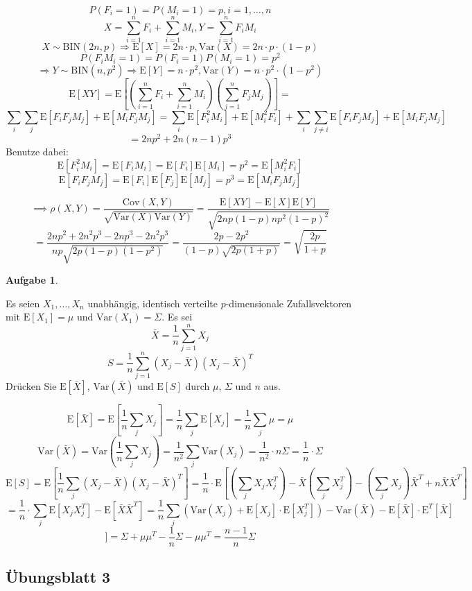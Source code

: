 \documentclass[12pt, a4paper]{article}
\newcommand{\E}{\mbox{I\negthinspace E}}
\theoremstyle{plain}
\theoremstyle{definition}
\newtheorem{aufgabe}{Aufgabe}
\newcommand{\1}{\mathds{1}}
\renewcommand{\E}{\mathrm{E}}
\newcommand{\Var}{\mathrm{Var}}
\newcommand{\BIN}{\mathrm{BIN}}
\newcommand{\Cov}{\mathrm{Cov}}
\begin{document}
\[ P(F_i=1) = P(M_i=1) = p, i=1,\dots,n \]
\[ X = \sum_{i=1}^n F_i + \sum_{i=1}^n M_i, Y = \sum_{i=1}^n F_iM_i \]
\[ X \sim \BIN(2n,p) \Rightarrow \E[X] = 2n \cdot p, \Var(X) = 2n \cdot p \cdot (1-p) \]
\[ P(F_iM_i = 1) = P(F_i=1) P(M_i=1) = p^2 \]
\[ \Rightarrow Y \sim \BIN(n,p^2) \Rightarrow \E[Y] = n \cdot p^2, \Var(Y) = n \cdot p^2 \cdot (1-p^2) \]
\[ \E[XY] = \E \left[ \left( \sum_{i=1}^n F_i + \sum_{i=1}^n M_i \right) \left( \sum_{j=1}^n F_jM_j \right) \right] =\]
\[ \sum_i \sum_j \E[F_iF_jM_j] + \E[M_iF_jM_j] = \sum_i \E[F_i^2M_i] + \E[M_i^2F_i] + \sum_i \sum_{j\neq i} \E[F_iF_jM_j] + \E[M_iF_jM_j] \]
\[= 2np^2 + 2n(n-1)p^3\]
Benutze dabei:
\[ \E[F_i^2M_i] = \E[F_iM_i] = \E[F_i] \E[M_i] = p^2 = \E[M_i^2F_i] \]
\[ \E[F_iF_jM_j] = \E[F_i] \E[F_j] \E[M_j] = p^3 = \E[M_iF_jM_j] \]

\[ \implies \rho(X,Y) = \frac{\Cov(X,Y)}{\sqrt{\Var(X)\Var(Y)}} = \frac{\E[XY] - \E[X]\E[Y]}{\sqrt{2np(1-p)np^2(1-p)^2}} \]
\[= \frac{2np^2+2n^2p^3-2np^3-2n^2p^3}{np\sqrt{2p(1-p)(1-p^2)}} = \frac{2p-2p^2}{(1-p)\sqrt{2p(1+p)}} = \sqrt{\frac{2p}{1+p}} \]


\begin{aufgabe} 
\end{aufgabe}


Es seien \(X_1, \dots, X_n\) unabhängig, identisch verteilte \(p\)-dimensionale Zufallsvektoren mit \(\E[X_1] = \mu\) und \(\Var(X_1) = \Sigma\). Es sei
\[ \bar{X} = \frac{1}{n} \sum_{j=1}^n X_j \]
\[ S = \frac{1}{n} \sum_{j=1}^n (X_j - \bar{X})(X_j - \bar{X})^T \]
Drücken Sie \(\E[\bar{X}]\), \(\Var(\bar{X})\) und \(\E[S]\) durch \(\mu\), \(\Sigma\) und \(n\) aus.

\[ \E[\bar{X}] = \E \left[ \frac{1}{n} \sum_j X_j \right] = \frac{1}{n} \sum_j \E[X_j] = \frac{1}{n} \sum_j \mu = \mu \]
\[ \Var(\bar{X}) = \Var \left( \frac{1}{n} \sum_j X_j \right) = \frac{1}{n^2} \sum_j \Var(X_j) = \frac{1}{n^2} \cdot n\Sigma = \frac{1}{n} \cdot \Sigma \]
\[ \E[S] = \E \left[ \frac{1}{n} \sum_j (X_j-\bar{X})(X_j-\bar{X})^T \right] = \frac{1}{n} \cdot \E \left[ \left( \sum_j X_jX_j^T \right) - \bar{X} \left( \sum_j X_j^T \right) - \left( \sum_j X_j \right) \bar{X}^T + n\bar{X}\bar{X}^T \right] \]
\[= \frac{1}{n} \cdot \sum_j \E [X_jX_j^T] - \E[\bar{X}\bar{X}^T] = \frac{1}{n} \sum_j (\Var(X_j) + \E[X_j] \cdot \E[X_j^T]) - \Var(\bar{X}) - \E[\bar{X}] \cdot \E^T[\bar{X}]\]
\[] = \Sigma + \mu\mu^T - \frac{1}{n} \Sigma - \mu\mu^T = \frac{n-1}{n} \Sigma \]


\subsection*{Übungsblatt 3}
\end{document}

